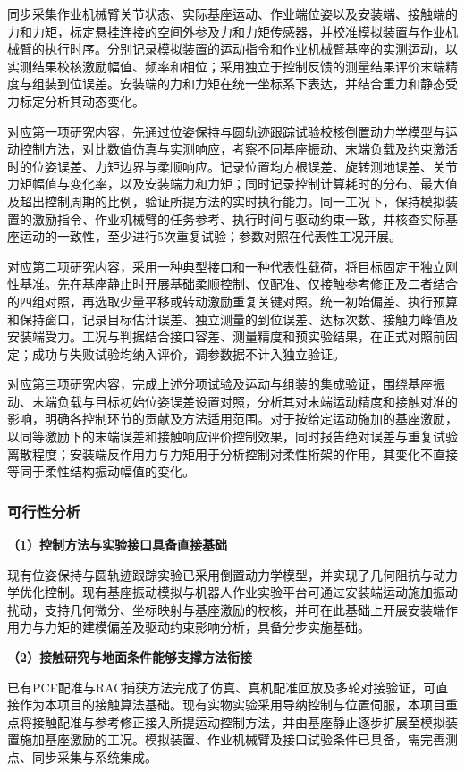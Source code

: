 \documentclass[UTF8,a4paper,zihao=-4,fontset=fandol]{ctexart}
\newcommand{\topic}[1]{\par\addvspace{0.5em}\noindent\textbf{#1}\par\nobreak}
\begin{document}
同步采集作业机械臂关节状态、实际基座运动、作业端位姿以及安装端、接触端的力和力矩，标定悬挂连接的空间外参及力和力矩传感器，并校准模拟装置与作业机械臂的执行时序。分别记录模拟装置的运动指令和作业机械臂基座的实测运动，以实测结果校核激励幅值、频率和相位；采用独立于控制反馈的测量结果评价末端精度与组装到位误差。安装端的力和力矩在统一坐标系下表达，并结合重力和静态受力标定分析其动态变化。

对应第一项研究内容，先通过位姿保持与圆轨迹跟踪试验校核倒置动力学模型与运动控制方法，对比数值仿真与实测响应，考察不同基座振动、末端负载及约束激活时的位姿误差、力矩边界与柔顺响应。记录位置均方根误差、旋转测地误差、关节力矩幅值与变化率，以及安装端力和力矩；同时记录控制计算耗时的分布、最大值及超出控制周期的比例，验证所提方法的实时执行能力。同一工况下，保持模拟装置的激励指令、作业机械臂的任务参考、执行时间与驱动约束一致，并核查实际基座运动的一致性，至少进行5次重复试验；参数对照在代表性工况开展。

对应第二项研究内容，采用一种典型接口和一种代表性载荷，将目标固定于独立刚性基准。先在基座静止时开展基础柔顺控制、仅配准、仅接触参考修正及二者结合的四组对照，再选取少量平移或转动激励重复关键对照。统一初始偏差、执行预算和保持窗口，记录目标估计误差、独立测量的到位误差、达标次数、接触力峰值及安装端受力。工况与判据结合接口容差、测量精度和预实验结果，在正式对照前固定；成功与失败试验均纳入评价，调参数据不计入独立验证。

对应第三项研究内容，完成上述分项试验及运动与组装的集成验证，围绕基座振动、末端负载与目标初始位姿误差设置对照，分析其对末端运动精度和接触对准的影响，明确各控制环节的贡献及方法适用范围。对于按给定运动施加的基座激励，以同等激励下的末端误差和接触响应评价控制效果，同时报告绝对误差与重复试验离散程度；安装端反作用力与力矩用于分析控制对柔性桁架的作用，其变化不直接等同于柔性结构振动幅值的变化。

\subsubsection{可行性分析}

\topic{（1）控制方法与实验接口具备直接基础}

现有位姿保持与圆轨迹跟踪实验已采用倒置动力学模型，并实现了几何阻抗与动力学优化控制。现有基座振动模拟与机器人作业实验平台可通过安装端运动施加振动扰动，支持几何微分、坐标映射与基座激励的校核，并可在此基础上开展安装端作用力与力矩的建模偏差及驱动约束影响分析，具备分步实施基础。

\topic{（2）接触研究与地面条件能够支撑方法衔接}

已有PCF配准与RAC捕获方法完成了仿真、真机配准回放及多轮对接验证，可直接作为本项目的接触算法基础。现有实物实验采用导纳控制与位置伺服，本项目重点将接触配准与参考修正接入所提运动控制方法，并由基座静止逐步扩展至模拟装置施加基座激励的工况。模拟装置、作业机械臂及接口试验条件已具备，需完善测点、同步采集与系统集成。
\end{document}
